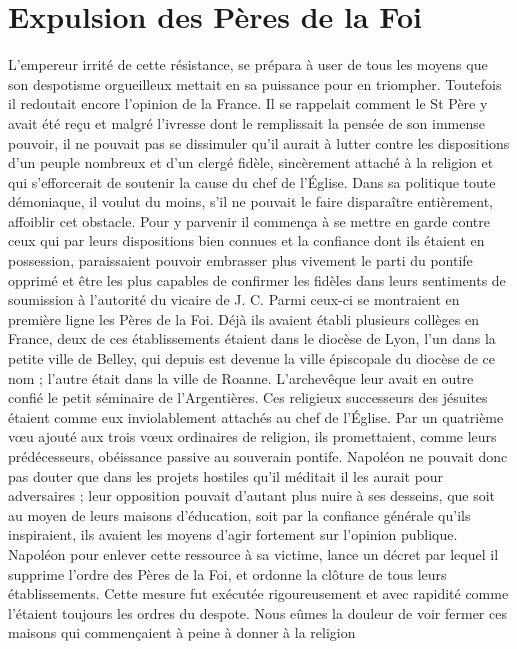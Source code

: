 \section*{Expulsion des Pères de la Foi}
L'empereur irrité de cette résistance, se prépara à user de tous les moyens que son despotisme orgueilleux mettait en sa puissance pour en triompher. Toutefois il redoutait encore l'opinion de la France. Il se rappelait comment le St Père y avait été reçu et malgré l'ivresse dont le remplissait la pensée de son immense pouvoir, il ne pouvait pas se dissimuler qu'il aurait à lutter contre les dispositions d'un peuple nombreux et d'un clergé fidèle, sincèrement attaché à la religion et qui s'efforcerait de soutenir la cause du chef de l'Église. Dans sa politique toute démoniaque, il voulut du moins, s'il ne pouvait le faire disparaître entièrement, affoiblir cet obstacle. Pour y parvenir
il commença à se mettre en garde contre ceux qui par leurs dispositions bien connues et la confiance dont ils étaient en possession, paraissaient pouvoir embrasser plus vivement le parti du pontife opprimé et être les plus capables de confirmer les fidèles dans leurs sentiments de soumission à l'autorité du vicaire de J. C. Parmi ceux-ci se montraient en première ligne les Pères de la Foi. Déjà ils avaient établi plusieurs collèges en France, deux de ces établissements étaient dans le diocèse de Lyon, l'un dans la petite ville de Belley, qui depuis est devenue la ville épiscopale du diocèse de ce nom ; l'autre était dans la ville de Roanne. L'archevêque leur avait en outre confié le petit séminaire de l'Argentières. Ces religieux successeurs des jésuites étaient comme eux inviolablement attachés au chef de l'Église. Par un quatrième vœu ajouté aux trois vœux ordinaires de religion, ils promettaient, comme leurs prédécesseurs, obéissance passive au souverain pontife. Napoléon ne pouvait donc pas douter que dans les projets hostiles qu'il méditait il les aurait pour adversaires ; leur opposition pouvait d'autant plus nuire à ses desseins, que soit au moyen de leurs maisons d'éducation, soit par la confiance générale qu'ils inspiraient, ils avaient les moyens d'agir fortement sur l'opinion publique. Napoléon pour enlever cette ressource à sa victime, lance un décret par lequel il supprime l'ordre des Pères de la Foi, et ordonne la clôture de tous leurs établissements. Cette mesure fut exécutée rigoureusement et avec rapidité comme l'étaient toujours les ordres du despote. Nous eûmes la douleur de voir fermer ces maisons qui commençaient à peine à donner à la religion
